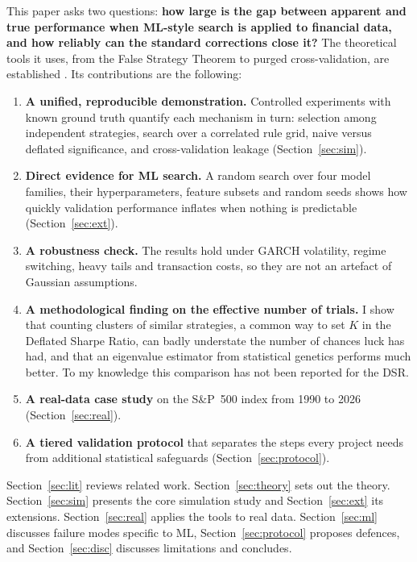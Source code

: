 \documentclass[11pt]{article}
\begin{document}
This paper asks two questions: \textbf{how large is the gap between apparent and true performance when ML-style search is applied to financial data, and how reliably can the standard corrections close it?} The theoretical tools it uses, from the False Strategy Theorem to purged cross-validation, are established \citep{bailey2014dsr,bailey2017pbo,lopezdeprado2018,lopezdeprado2021fst}. Its contributions are the following:
\begin{enumerate}
  \item \textbf{A unified, reproducible demonstration.} Controlled experiments with known ground truth quantify each mechanism in turn: selection among independent strategies, search over a correlated rule grid, naive versus deflated significance, and cross-validation leakage (Section~\ref{sec:sim}).
  \item \textbf{Direct evidence for ML search.} A random search over four model families, their hyperparameters, feature subsets and random seeds shows how quickly validation performance inflates when nothing is predictable (Section~\ref{sec:ext}).
  \item \textbf{A robustness check.} The results hold under GARCH volatility, regime switching, heavy tails and transaction costs, so they are not an artefact of Gaussian assumptions.
  \item \textbf{A methodological finding on the effective number of trials.} I show that counting clusters of similar strategies, a common way to set $K$ in the Deflated Sharpe Ratio, can badly understate the number of chances luck has had, and that an eigenvalue estimator from statistical genetics \citep{liji2005} performs much better. To my knowledge this comparison has not been reported for the DSR.
  \item \textbf{A real-data case study} on the S\&P~500 index from 1990 to 2026 (Section~\ref{sec:real}).
  \item \textbf{A tiered validation protocol} that separates the steps every project needs from additional statistical safeguards (Section~\ref{sec:protocol}).
\end{enumerate}

Section~\ref{sec:lit} reviews related work. Section~\ref{sec:theory} sets out the theory. Section~\ref{sec:sim} presents the core simulation study and Section~\ref{sec:ext} its extensions. Section~\ref{sec:real} applies the tools to real data. Section~\ref{sec:ml} discusses failure modes specific to ML, Section~\ref{sec:protocol} proposes defences, and Section~\ref{sec:disc} discusses limitations and concludes.
\end{document}
